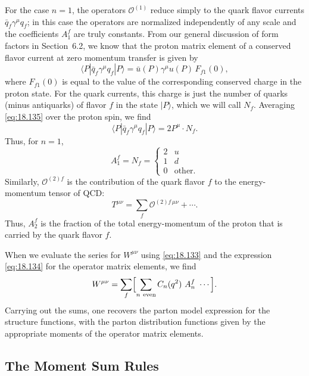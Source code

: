 For the case $n = 1$, the operators $\mathcal{O}^{(1)}$ reduce simply to the
quark flavor currents $\bar{q}_f\gamma^\mu q_f$; in this case the operators
are normalized independently of any scale and the coefficients $A_1^f$ are
truly constants.  From our general discussion of form factors in
Section~6.2, we know that the proton matrix element of a conserved flavor
current at zero momentum transfer is given by
\begin{equation}
  \langle P|\bar{q}_f\gamma^\mu q_f|P\rangle = \bar{u}(P)\gamma^\mu u(P)\,
    F_{f1}(0) ,
  \label{eq:18.135}
\end{equation}
where $F_{f1}(0)$ is equal to the value of the corresponding conserved charge
in the proton state.  For the quark currents, this charge is just the number
of quarks (minus antiquarks) of flavor $f$ in the state $|P\rangle$, which
we will call $N_f$.  Averaging \eqref{eq:18.135} over the proton spin, we find
\begin{equation}
  \langle P|\bar{q}_f\gamma^\mu q_f|P\rangle = 2P^\mu\cdot N_f .
  \label{eq:18.136}
\end{equation}
Thus, for $n = 1$,
\begin{equation}
  A_1^f = N_f = \begin{cases}2 & u\\ 1 & d\\ 0 & \text{other}.\end{cases}
  \label{eq:18.137}
\end{equation}
Similarly, $\mathcal{O}^{(2)f}$ is the contribution of the quark flavor $f$
to the energy-momentum tensor of QCD:
\begin{equation}
  T^{\mu\nu} = \sum_f \mathcal{O}^{(2)f\,\mu\nu} + \cdots .
  \label{eq:18.138}
\end{equation}
Thus, $A_2^f$ is the fraction of the total energy-momentum of the proton that
is carried by the quark flavor $f$.

When we evaluate the series for $W^{\mu\nu}$ using \eqref{eq:18.133} and the
expression \eqref{eq:18.134} for the operator matrix elements, we find
\begin{equation}
  W^{\mu\nu} = \sum_f \Bigl[ \sum_{n\ \text{even}} C_n(q^2)\ A_n^f\ \cdots
    \Bigr] .
  \label{eq:18.139}
\end{equation}
Carrying out the sums, one recovers the parton model expression for the
structure functions, with the parton distribution functions given by the
appropriate moments of the operator matrix elements.

\subsection{The Moment Sum Rules}

